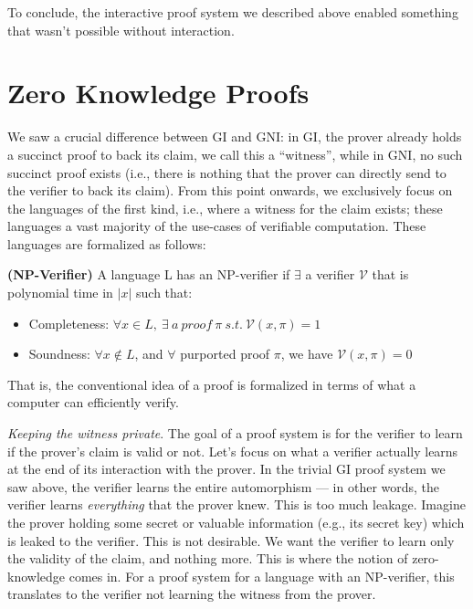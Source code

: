 		To conclude, the interactive proof system we described above enabled something that wasn't possible without interaction. 

\section{Zero Knowledge Proofs}
We saw a crucial difference between GI and GNI: in GI, the prover already holds a succinct proof to back its claim, we call this a ``witness'', while in GNI, no such succinct proof exists (i.e., there is nothing that the prover can directly send to the verifier to back its claim). From this point onwards, we exclusively focus on the languages of the first kind, i.e., where a witness for the claim exists; these languages a vast majority of the use-cases of verifiable computation. These languages are formalized as follows:

\begin{definition} {\normalfont\textbf{(NP-Verifier)}} A language L has an NP-verifier if $\exists$ a verifier $\mathcal{V}$ that is polynomial time in $|x|$ such that:
		\begin{itemize}
			\item Completeness: $\forall x\in L,\ \exists\ a\ proof\ \pi\ s.t.\ \mathcal{V}(x,\pi)=1$
			\item Soundness: $\forall x \notin L$, and $\forall$ purported proof $\pi$, we have $\mathcal{V}(x,\pi)=0$
		\end{itemize}
  \end{definition}

		That is, the conventional idea of a proof is formalized in terms of what a computer can efficiently verify.\smallskip %

	\noindent \textit{Keeping the witness private}. The goal of a proof system is for the verifier to learn if the prover's claim is valid or not. Let's focus on what a verifier actually learns at the end of its interaction with the prover. In the trivial GI proof system we saw above, the verifier learns the entire automorphism --- in other words, the verifier learns {\em everything} that the prover knew. 
	This is too much leakage. Imagine the prover holding some secret or valuable information (e.g., its secret key) which is leaked to the verifier. This is not desirable. We want the verifier to learn only the validity of the claim, and nothing more. This is where the notion of zero-knowledge comes in.
	For a proof system for a language with an NP-verifier, this translates to the verifier not learning the witness from the prover.
	
